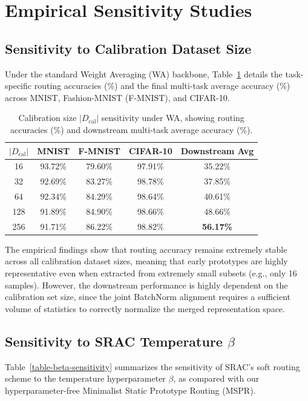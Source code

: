 \documentclass{article}
\theoremstyle{plain}
\theoremstyle{definition}
\theoremstyle{remark}
\begin{document}
\newpage
\section{Empirical Sensitivity Studies}
\label{sensitivity-appendix}

\subsection{Sensitivity to Calibration Dataset Size}
Under the standard Weight Averaging (WA) backbone, Table~\ref{table-calibration-size} details the task-specific routing accuracies (\%) and the final multi-task average accuracy (\%) across MNIST, Fashion-MNIST (F-MNIST), and CIFAR-10.

\begin{table}[H]
\caption{Calibration size $|D_{\text{cal}}|$ sensitivity under WA, showing routing accuracies (\%) and downstream multi-task average accuracy (\%).}
\label{table-calibration-size}
\vskip 0.05in
\begin{center}
\begin{footnotesize}
\setlength{\tabcolsep}{6pt}
\begin{tabular}{ccccc}
\toprule
$|D_{\text{cal}}|$ & MNIST & F-MNIST & CIFAR-10 & Downstream Avg \\
\midrule
16  & 93.72\% & 79.60\% & 97.91\% & 35.22\% \\
32  & 92.69\% & 83.27\% & 98.78\% & 37.85\% \\
64  & 92.34\% & 84.29\% & 98.64\% & 40.61\% \\
128 & 91.89\% & 84.90\% & 98.66\% & 48.66\% \\
256 & 91.71\% & 86.22\% & 98.82\% & \textbf{56.17\%} \\
\bottomrule
\end{tabular}
\end{footnotesize}
\end{center}
\vskip -0.15in
\end{table}

The empirical findings show that routing accuracy remains extremely stable across all calibration dataset sizes, meaning that early prototypes are highly representative even when extracted from extremely small subsets (e.g., only 16 samples). However, the downstream performance is highly dependent on the calibration set size, since the joint BatchNorm alignment requires a sufficient volume of statistics to correctly normalize the merged representation space.

\newpage
\subsection{Sensitivity to SRAC Temperature \texorpdfstring{$\beta$}{beta}}
Table~\ref{table-beta-sensitivity} summarizes the sensitivity of SRAC's soft routing scheme to the temperature hyperparameter $\beta$, as compared with our hyperparameter-free Minimalist Static Prototype Routing (MSPR).
\end{document}
